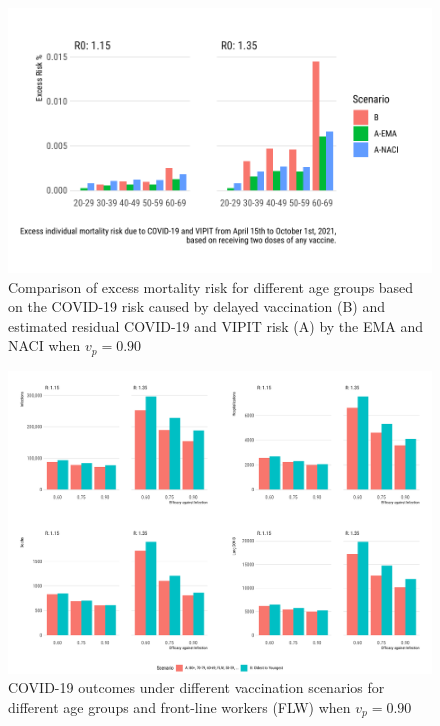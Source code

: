 \begin{figure}[htb]
\begin{center}
\includegraphics[width=6in]{"../figures/vp0.60/fig3.pdf"}
\caption{Comparison of excess mortality risk for different age groups based on the COVID-19 risk caused by delayed vaccination (B) and estimated residual COVID-19 and VIPIT risk (A) by the EMA and NACI when $v_p=0.90$}
\end{center}
\end{figure}


\begin{figure}[htb]
\begin{center}
\includegraphics[width=6in]{"../figures/vp0.60/fig-barplots.pdf"}
\caption{COVID-19 outcomes under different vaccination scenarios for different age groups and front-line workers (FLW) when $v_p=0.90$}
\end{center}
\end{figure}

